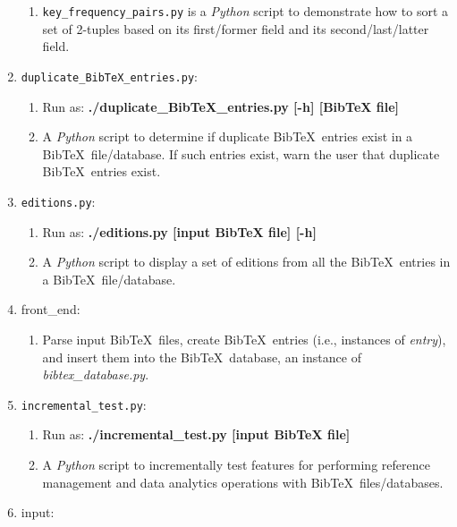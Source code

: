 \begin{enumerate}
\begin{enumerate}
	\item {\tt key\_frequency\_pairs.py} is a {\it Python} script to demonstrate how to sort a set of 2-tuples based on its first/former field and its second/last/latter field.
	\end{enumerate}
\item {\tt duplicate\_BibTeX\_entries.py}: \vspace{-0.3cm}
	\begin{enumerate} \itemsep -2pt
	\item Run as: {\bf ./duplicate\_BibTeX\_entries.py [-h] [BibTeX file]}
	\item A {\it Python} script to determine if duplicate {\sc Bib}\TeX\ entries exist in a {\sc Bib}\TeX\ file/database. If such entries exist, warn the user that duplicate {\sc Bib}\TeX\ entries exist. 
	\end{enumerate}
\item {\tt editions.py}: \vspace{-0.3cm}
	\begin{enumerate} \itemsep -2pt
	\item Run as: {\bf ./editions.py [input BibTeX file] [-h]}
	\item A {\it Python} script to display a set of editions from all the {\sc Bib}\TeX\ entries in a {\sc Bib}\TeX\ file/database.
	\end{enumerate}
\item front\_end: \vspace{-0.3cm}
	\begin{enumerate} \itemsep -2pt
	\item Parse input {\sc Bib}\TeX\ files, create {\sc Bib}\TeX\ entries (i.e., instances of {\it entry}), and insert them into the {\sc Bib}\TeX\ database, an instance of {\it bibtex\_database.py}.
	\end{enumerate}
\item {\tt incremental\_test.py}: \vspace{-0.3cm}
	\begin{enumerate} \itemsep -2pt
	\item Run as: {\bf ./incremental\_test.py [input BibTeX file]}
	\item A {\it Python} script to incrementally test features for performing reference management and data analytics operations with {\sc Bib}\TeX\ files/databases.
	\end{enumerate}
\item input: \vspace{-0.3cm}
	\begin{enumerate} \itemsep -2pt

\end{enumerate}
\end{enumerate}
